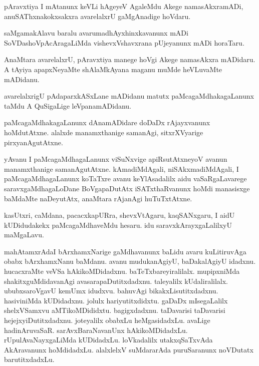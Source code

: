 \documentclass{article}
\begin{document}
\begin{mn}
pAravxtiya  I  mAtanunx  keVLi  hAgeyeV  AgaleMdu  Akege  namasAkxramADi,  anuSAThxnakokxsakxra  avarelalxrU  
gaMgAnadige  hoVdaru. 
\end{mn}

\begin{mn}
saMgamakAlavu  baralu  avarumadhAyxhinxkavanunx  mADi  SoVDashoVpAcAragaLiMda  vishevxVshavxrana  
pUjeyanunx  mADi  horaTaru.
\end{mn}

\begin{mn}
AnaMtara  avarelalxrU,  pAravxtiya  manege  hoVgi  Akege  namasAkxra  mADidaru.  A  tAyiya  apapxNeyaMte
shAlaMkAyana  maganu  muMde  heVLuvaMte  mADidanu.
\end{mn}

\begin{mn}
avarelalxrigU  pAdaparxkASxLane  mADidanu  matutx  paMcagaMdhakagaLanunx  taMdu  A  QuSigaLige  leVpanamADidanu.
\end{mn}

\begin{mn}
paMcagaMdhakagaLanunx  dAnamADidare  doDaDx  rAjayxvanunx  hoMdutAtxne.  alalxde  manamxthanige  samanAgi,  
sitxrXVyarige  pirxyanAgutAtxne.
\end{mn}

\begin{mn}
yAvanu  I  paMcagaMdhagaLanunx  viSuNxvige  apiRsutAtxneyoV  avanun  manamxthanige  samanAgutAtxne.  kAmadiMdAgali,  
niSAkxmadiMdAgali,  I  paMcagaMdhagaLanunx  koTaTxre  avanu  keYlAsadalilx  aidu  vaSaRgaLavarege  saravxgaMdhagaLoDane  
BoVgapaDutAtx  iSATxthaRvanunx  hoMdi  manasisxge  baMdaMte  naDeyutAtx,  anaMtara  rAjanAgi  huTuTxtAtxne.
\end{mn}

\begin{mn}
kasUtxri,  caMdana,  pacacxkapURra,  shevxVtAgaru,  kaqSANxgaru,  I  aidU  kUDidudakekx  paMcagaMdhaveMdu  hesaru.  
idu  saravxkArayxgaLalilxyU  maMgaLavu.
\end{mn}

\begin{mn}
mahAtamxrAdaI  bArxhamxNarige  gaMdhavanunx  baLidu  avaru  kuLitiruvAga  obabx  bArxhamxNanu  baMdanu.  avanu  
mudukanAgiyU,  baDakalAgiyU  idadxnu.  hucacxraMte  veVSa hAkikoMDidadxnu.  baTeTxbareyiralilalx.  mupipxniMda  
shakitxguMdidavanAgi  avasarapaDutitxdadxnu.  taleyalilx  kUdaliralilalx.  ububxsaroVgavU  kemUmx  idudxvu.  
bahuvAgi  bikakxLisutitxdadxnu.  hasiviniMda  kUDidadxnu.  jolulx  hariyutitxdidxtu.  gaDaDx  mIsegaLalilx  
shelxVSamxvu  aMTikoMDididxtu.  bagigxdadxnu.  taDavarisi  taDavarisi  hejejxyiDutitxdadxnu.  joteyalilx  obabxLu  
heMgasidadxLu.  avaLige  hadinAruvaSaR.  sarAvxBaraNavanUnx  hAkikoMDidadxLu.  rUpulAvaNayxgaLiMda  kUDidadxLu.  
loVkadalilx  utakxqSaTxvAda  AkAravanunx  hoMdidadxLu.  alalxlelxV  suMdararAda  puruSaranunx  noVDutatx  barutitxdadxLu.
\end{mn}
\end{document}
